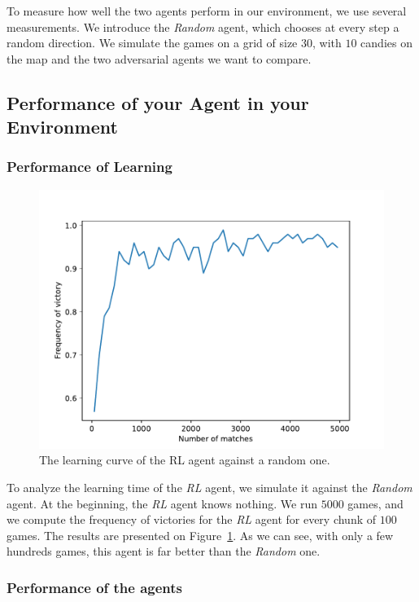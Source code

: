 \documentclass[journal, a4paper]{IEEEtran}
\begin{document}
To measure how well the two agents perform in our environment, we use several measurements.
We introduce the \emph{Random} agent, which chooses at every step a random direction.
We simulate the games on a grid of size $30$, with $10$ candies on the map and the two adversarial agents we want to compare.

\subsection{Performance of your Agent in your Environment}

\subsubsection{Performance of Learning}

\begin{figure}[h]
	\centering
    \includegraphics[width=0.95\columnwidth]{images/learning_curve_against_random.pdf}
    \caption{\label{learning_curve_against_random}The learning curve of the RL agent against a random one.}
\end{figure}

To analyze the learning time of the \emph{RL} agent, we simulate it against the \emph{Random} agent.
At the beginning, the \emph{RL} agent knows nothing.
We run $5000$ games, and we compute the frequency of victories for the \emph{RL} agent for every chunk of $100$ games.
The results are presented on Figure~\ref{learning_curve_against_random}.
As we can see, with only a few hundreds games, this agent is far better than the \emph{Random} one.

\subsubsection{Performance of the agents}
\end{document}
